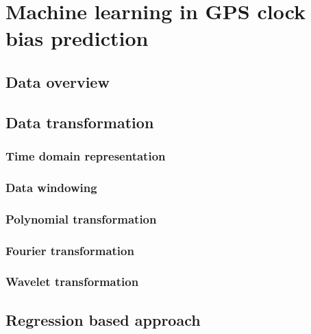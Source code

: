 \chapter{Machine learning in GPS clock bias prediction}



\section{Data overview}

\section{Data transformation}

\subsection{Time domain representation}
\subsection{Data windowing}
\subsection{Polynomial transformation}
\subsection{Fourier transformation}
\subsection{Wavelet transformation}

\section{Regression based approach}

